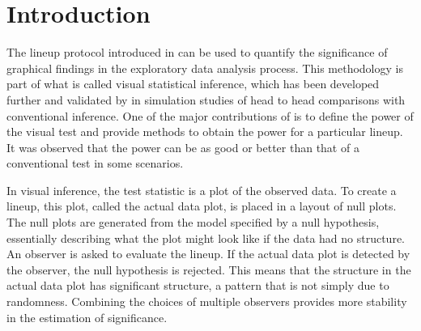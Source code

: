 \documentclass[10pt]{article}\usepackage[]{graphicx}\usepackage[]{color}
\begin{document}

\section{Introduction}  

The lineup protocol introduced in \citet{buja:2009} can be used to quantify the significance of graphical findings in the exploratory data analysis process. This methodology is  part of what is called visual statistical inference, which has been developed further  and validated by \citet{majumder:2013} in simulation studies of head to head comparisons with conventional inference. One of the major contributions of  \citet{majumder:2013}  is to define the power of the visual test and provide methods to obtain the power for a particular lineup. It was observed that the power can be as good or better than that of a conventional test in some scenarios.

In visual inference, the test statistic is a plot of the observed data. To create a lineup, this plot, called the actual data plot, is placed in a layout of null plots. The null plots  are generated from the model specified by a null hypothesis, essentially describing what the plot might look like if the data had no structure. An observer is asked to evaluate the lineup. If the  actual data plot is detected by the observer, the null hypothesis is rejected. This means that the structure in the actual data plot has significant structure, a pattern that is not simply due to randomness. Combining the choices of multiple observers provides more stability in the estimation of significance.

\end{document}
